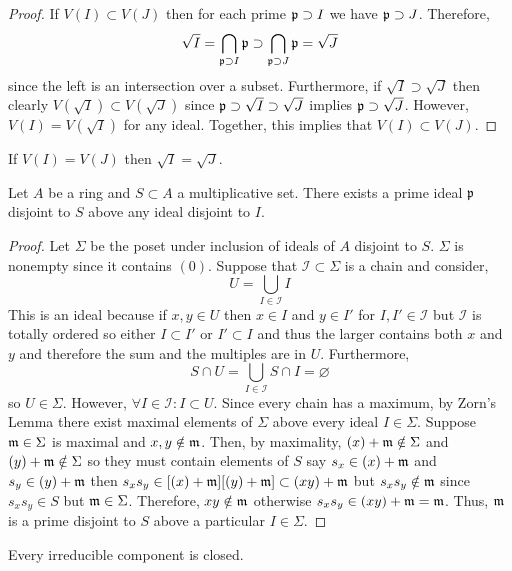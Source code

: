 \documentclass[12pt]{extarticle}
\begin{document}
\begin{proof}
If $V(I) \subset V(J)$ then for each prime $\mathfrak{p} \supset I$ we have $\mathfrak{p} \supset J$. Therefore,
\[  \sqrt{I} = \bigcap_{\mathfrak{p} \supset I} \mathfrak{p} \supset \bigcap_{\mathfrak{p} \supset J} \mathfrak{p} = \sqrt{J} \]
since the left is an intersection over a subset. Furthermore, if $\sqrt{I} \supset \sqrt{J}$ then clearly $V(\sqrt{I}) \subset V(\sqrt{J})$ since $\mathfrak{p} \supset \sqrt{I} \supset \sqrt{J}$ implies $\mathfrak{p} \supset \sqrt{J}$. However, $V(I) = V(\sqrt{I})$ for any ideal. Together, this implies that $V(I) \subset V(J)$. 
\end{proof}

\begin{corollary}
If $V(I) = V(J)$ then $\sqrt{I} = \sqrt{J}$.
\end{corollary}

\begin{lemma} \label{prime_disjoint_to}
Let $A$ be a ring and $S \subset A$ a multiplicative set. There exists a prime ideal $\mathfrak{p}$ disjoint to $S$ above any ideal disjoint to $I$. 
\end{lemma}

\begin{proof}
Let $\Sigma$ be the poset under inclusion of ideals of $A$ disjoint to $S$. $\Sigma$ is nonempty since it contains $(0)$. Suppose that $\mathcal{I} \subset \Sigma$ is a chain and consider,
\[ U = \bigcup_{I \in \mathcal{I}} I \]
This is an ideal because if $x, y \in U$ then $x \in I$ and $y \in I'$ for $I, I' \in \mathcal{I}$ but $\mathcal{I}$ is totally ordered so either $I \subset I'$ or $I' \subset I$ and thus the larger contains both $x$ and $y$ and therefore the sum and the multiples are in $U$. 
Furthermore,
\[ S \cap U = \bigcup_{I \in \mathcal{I}} S \cap I = \varnothing \]
so $U \in \Sigma$. However, $\forall I \in \mathcal{I} : I \subset U$. Since every chain has a maximum, by Zorn's Lemma there exist maximal elements of $\Sigma$ above every ideal $I \in \Sigma$. Suppose $\mathfrak{m} \in \Sigma$ is maximal and $x,y \notin \mathfrak{m}$. Then, by maximality, $(x) + \mathfrak{m} \notin \Sigma$ and $(y) + \mathfrak{m} \notin \Sigma$ so they must contain elements of $S$ say $s_x \in (x) + \mathfrak{m}$ and $s_y \in (y) + \mathfrak{m}$ then $s_x s_y \in [(x) + \mathfrak{m}][(y) + \mathfrak{m}] \subset (xy) + \mathfrak{m}$ but $s_x s_y \notin \mathfrak{m}$ since $s_x s_y \in S$ but $\mathfrak{m} \in \Sigma$. Therefore, $xy \notin \mathfrak{m}$ otherwise $s_x s_y \in (xy) + \mathfrak{m} = \mathfrak{m}$. Thus, $\mathfrak{m}$ is a prime disjoint to $S$ above a particular $I \in \Sigma$. 
\end{proof}

\begin{lemma}
Every irreducible component is closed.
\end{lemma}
\end{document}
